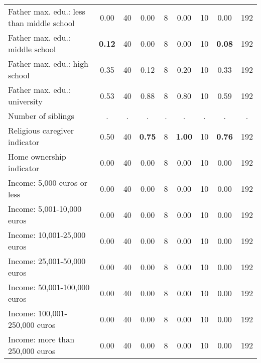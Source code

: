 \begin{tabular}{l c c c c c c c c}
Father max. edu.: less than middle school &      0.00 &        40 &      0.00 &         8 &      0.00 &        10 &      0.00 &       192 \\
Father max. edu.: middle school & \textbf{     0.12} &        40 &      0.00 &         8 &      0.00 &        10 & \textbf{     0.08} &       192 \\
Father max. edu.: high school &      0.35 &        40 &      0.12 &         8 &      0.20 &        10 &      0.33 &       192 \\
Father max. edu.: university &      0.53 &        40 &      0.88 &         8 &      0.80 &        10 &      0.59 &       192 \\
Number of siblings &         . & . &         . & . &         . & . &         . & . \\
Religious caregiver indicator &      0.50 &        40 & \textbf{     0.75} &         8 & \textbf{     1.00} &        10 & \textbf{     0.76} &       192 \\
Home ownership indicator &      0.00 &        40 &      0.00 &         8 &      0.00 &        10 &      0.00 &       192 \\
Income: 5,000 euros or less &      0.00 &        40 &      0.00 &         8 &      0.00 &        10 &      0.00 &       192 \\
Income: 5,001-10,000 euros &      0.00 &        40 &      0.00 &         8 &      0.00 &        10 &      0.00 &       192 \\
Income: 10,001-25,000 euros &      0.00 &        40 &      0.00 &         8 &      0.00 &        10 &      0.00 &       192 \\
Income: 25,001-50,000 euros &      0.00 &        40 &      0.00 &         8 &      0.00 &        10 &      0.00 &       192 \\
Income: 50,001-100,000 euros &      0.00 &        40 &      0.00 &         8 &      0.00 &        10 &      0.00 &       192 \\
Income: 100,001-250,000 euros &      0.00 &        40 &      0.00 &         8 &      0.00 &        10 &      0.00 &       192 \\
Income: more than 250,000 euros &      0.00 &        40 &      0.00 &         8 &      0.00 &        10 &      0.00 &       192 \\
\bottomrule
\end{tabular}
